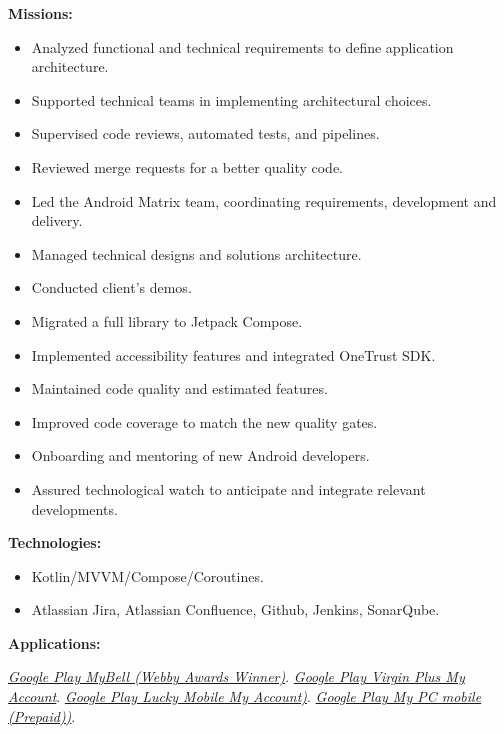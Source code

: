 \documentclass[10pt,a4paper,withhyper]{altacv}
\begin{document}
\begin{paracol}{2}
\textbf{Missions:}
\begin{itemize}
\addtolength{\itemindent}{0.1cm}
\item Analyzed functional and technical requirements to define application architecture.
\item Supported technical teams in implementing architectural choices.
\item Supervised code reviews, automated tests, and pipelines.
\item Reviewed merge requests for a better quality code.
\item Led the Android Matrix team, coordinating requirements, development and delivery.
\item Managed technical designs and solutions architecture.
\item Conducted client’s demos.
\item Migrated a full library to Jetpack Compose.
\item Implemented accessibility features and integrated OneTrust SDK.
\item Maintained code quality and estimated features.
\item Improved code coverage to match the new quality gates.
\item Onboarding and mentoring of new Android developers.
\item Assured technological watch to anticipate and integrate relevant developments.
\end{itemize}

\textbf{Technologies:}

\begin{itemize}
\addtolength{\itemindent}{0.1cm}
\item Kotlin/MVVM/Compose/Coroutines.
\item Atlassian Jira, Atlassian Confluence, Github, Jenkins, SonarQube.

\end{itemize}

\textbf{Applications:}

\href{https://play.google.com/store/apps/details?id=ca.bell.selfserve.mybellmobile&hl=en&gl=CA&pli=1}{\textit{Google Play MyBell (Webby Awards Winner)}}.
\newline
\href{https://play.google.com/store/apps/details?id=ca.virginmobile.myaccount.virginmobile&hl=en}{\textit{Google Play Virgin Plus My Account}}.
\newline
\href{https://play.google.com/store/apps/details?id=ca.luckymobile&hl=en}{\textit{Google Play Lucky Mobile My Account)}}.
\newline
\href{https://play.google.com/store/apps/details?id=ca.pcmobile.selfserve.mypcmobile&hl=en}{\textit{Google Play My PC mobile (Prepaid))}}.


\end{paracol}
\end{document}
